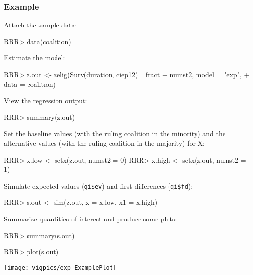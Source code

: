 \subsubsection{Example}

Attach the sample data: 
\begin{Schunk}
\begin{Sinput}
RRR>  data(coalition)
\end{Sinput}
\end{Schunk}

Estimate the model: 
\begin{Schunk}
\begin{Sinput}
RRR>  z.out <- zelig(Surv(duration, ciep12) ~ fract + numst2, model = "exp", 
+                  data = coalition)
\end{Sinput}
\end{Schunk}
View the regression output:  
\begin{Schunk}
\begin{Sinput}
RRR>  summary(z.out)
\end{Sinput}
\end{Schunk}
Set the baseline values (with the ruling coalition in the minority)
and the alternative values (with the ruling coalition in the majority)
for X:
\begin{Schunk}
\begin{Sinput}
RRR>  x.low <- setx(z.out, numst2 = 0)
RRR>  x.high <- setx(z.out, numst2 = 1)
\end{Sinput}
\end{Schunk}
Simulate expected values ({\tt qi\$ev}) and first differences ({\tt qi\$fd}):
\begin{Schunk}
\begin{Sinput}
RRR>  s.out <- sim(z.out, x = x.low, x1 = x.high)
\end{Sinput}
\end{Schunk}
Summarize quantities of interest and produce some plots:  
\begin{Schunk}
\begin{Sinput}
RRR>  summary(s.out)
\end{Sinput}
\end{Schunk}
\begin{center}
\begin{Schunk}
\begin{Sinput}
RRR>  plot(s.out)
\end{Sinput}
\end{Schunk}
\texttt{[image: vigpics/exp-ExamplePlot]}
\end{center}


